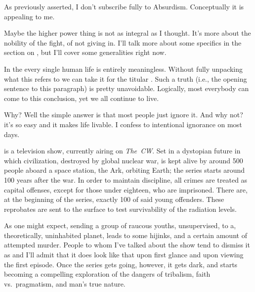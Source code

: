 \documentclass[../butidigress.tex]{subfiles}
\begin{document}
As previously asserted, I don't subscribe fully to Absurdism.
Conceptually it is appealing to me.

Maybe the higher power thing is not as integral as I thought.
It's more about the nobility of the fight, of not giving in.
I'll talk more about some specifics in the section on , but I'll cover some generalities right now.


In the  every single human life is entirely meaningless. Without fully unpacking what  this refers to we can take it for the titular . Such a truth (i.e., the opening sentence to this paragraph) is pretty unavoidable. Logically, most everybody can come to this conclusion, yet we all continue to live.\par Why? Well the simple answer is that most people just ignore it. And why not? it's so easy and it makes life livable. I confess to intentional ignorance on most days.

 is a television show, currently airing on \textit{The~CW}.
Set in a dystopian future in which civilization, destroyed by global nuclear war, is kept alive by around 500 people aboard a space station, the Ark, orbiting Earth; the series starts around 100 years after the war.
In order to maintain discipline, all crimes are treated as capital offenses, except for those under eighteen, who are imprisoned.
There are, at the beginning of the series, exactly 100 of said young offenders.
These reprobates are sent to the surface to test survivability of the radiation levels.

As one might expect, sending a group of raucous youths, unsupervised, to a, theoretically, uninhabited planet, leads to some hijinks, and a certain amount of attempted murder.
People to whom I've talked about the show tend to dismiss it as  and I'll admit that it does look like that upon first glance and upon viewing the first episode.
Once the series gets going, however, it gets dark, and starts becoming a compelling exploration of the dangers of tribalism, faith vs.\ pragmatism, and man's true nature.
\end{document}
